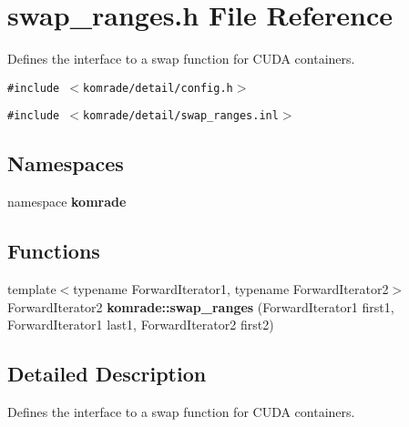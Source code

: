\section{swap\_\-ranges.h File Reference}
\label{swap__ranges_8h}
Defines the interface to a swap function for CUDA containers. 

{\tt \#include $<$komrade/detail/config.h$>$}\par
{\tt \#include $<$komrade/detail/swap\_\-ranges.inl$>$}\par
\subsection*{Namespaces}
\begin{CompactItemize}
\item 
namespace {\bf komrade}
\end{CompactItemize}
\subsection*{Functions}
\begin{CompactItemize}
\item 
{\footnotesize template$<$typename ForwardIterator1, typename ForwardIterator2$>$ }\\ForwardIterator2 {\bf komrade::swap\_\-ranges} (ForwardIterator1 first1, ForwardIterator1 last1, ForwardIterator2 first2)
\end{CompactItemize}


\subsection{Detailed Description}
Defines the interface to a swap function for CUDA containers. 

